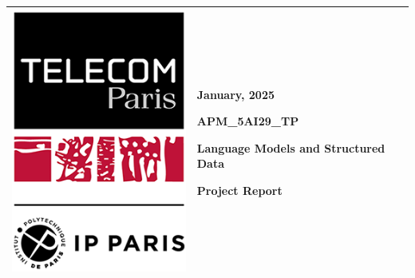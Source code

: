 \documentclass[12pt,a4paper]{article}
\begin{document}
\begin{center}
  \begin{tabular}{|p{}|p{}|}
    \hline
    {
    \vspace{0cm} %
    \centerline{\includegraphics[width=\linewidth]{tp-ipp.png}}
    }
    & {
      \vspace{0cm} %
      \centering
      \large
      {\hfill January, 2025}
      
      \vspace*{.5cm}
      \textbf{APM\_5AI29\_TP}
      
      \vspace*{.5cm}
      \setstretch{1.5}
      {\Large\textbf{Language Models and Structured Data}}
      
      \vspace*{.5cm}
       Project Report

      \vspace*{1cm}
      } \\
    \hline
  \end{tabular}
\end{center}
\end{document}

